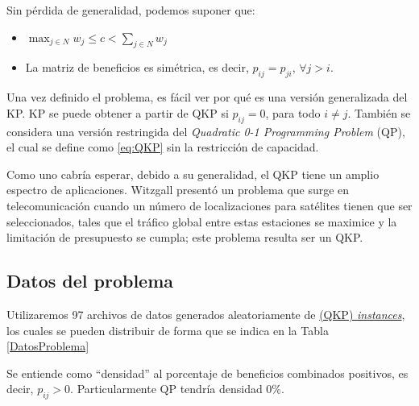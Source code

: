 Sin pérdida de generalidad, podemos suponer que:
\begin{itemize}
	\item $\max_{j\in N} w_j \leq c < \sum_{j\in N}w_j$
	\item La matriz de beneficios es simétrica, es decir, $p_{ij} = p_{ji}$, $\forall j > i$.
\end{itemize}

Una vez definido el problema, es fácil ver por qué es una versión generalizada del KP. 
KP se puede obtener a partir de QKP si $p_{ij} = 0$, para todo $i\neq j$. 
También se considera una versión restringida del \textit{Quadratic 0-1 Programming Problem} (QP), el cual se define como \ref{eq:QKP} sin la restricción de capacidad.

Como uno cabría esperar, debido a su generalidad, el QKP tiene un amplio espectro de aplicaciones. 
Witzgall \parencite{witzgallMathematicalMethodsSite1975} presentó un problema que surge en telecomunicación cuando un número de localizaciones para satélites tienen que ser seleccionados, tales que el tráfico global entre estas estaciones se maximice y la limitación de presupuesto se cumpla; este problema resulta ser un QKP. 


\subsection{Datos del problema}

Utilizaremos 97 archivos de datos generados aleatoriamente de \href{http://cedric.cnam.fr/~soutif/QKP/QKP.html}{(QKP) \textit{instances}}, los cuales se pueden distribuir de forma que se indica en la Tabla \ref{DatosProblema}

Se entiende como ``densidad'' al porcentaje de beneficios combinados positivos, es decir, $p_{ij} > 0$. 
Particularmente QP tendría densidad 0\%.

